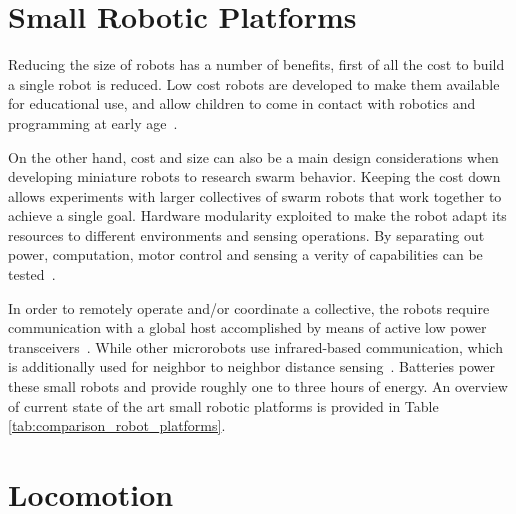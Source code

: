 \section{Small Robotic Platforms}
\label{sec:rw_robotic_platforms}






Reducing the size of robots has a number of benefits, first of all the cost to build a single robot is reduced.
Low cost robots are developed to make them available for educational use, and allow children to come in contact with robotics and programming at early age~\cite{rubenstein_icra_2015}.

On the other hand, cost and size can also be a main design considerations when developing miniature robots to research swarm behavior.
Keeping the cost down allows experiments with larger collectives of swarm robots that work together to achieve a single goal.
Hardware modularity exploited to make the robot adapt its resources to different environments and sensing operations.
By separating out power, computation, motor control and sensing a verity of capabilities can be tested~\cite{sabelhaus_icra_2013, pickem_icra_2015, kim_iros_2016}.

In order to remotely operate and/or coordinate a collective, the robots require communication with a global host accomplished by means of active low power transceivers~\cite{sabelhaus_icra_2013, pickem_icra_2015, kim_iros_2016}. 
While other microrobots use infrared-based communication, which is additionally used for neighbor to neighbor distance sensing~\cite{rubenstein_icra_2012}.
Batteries power these small robots and provide roughly one to three hours of energy.
An overview of current state of the art small robotic platforms is provided in Table \ref{tab:comparison_robot_platforms}.


\section{Locomotion}
\label{sec:rw_locomotion}

